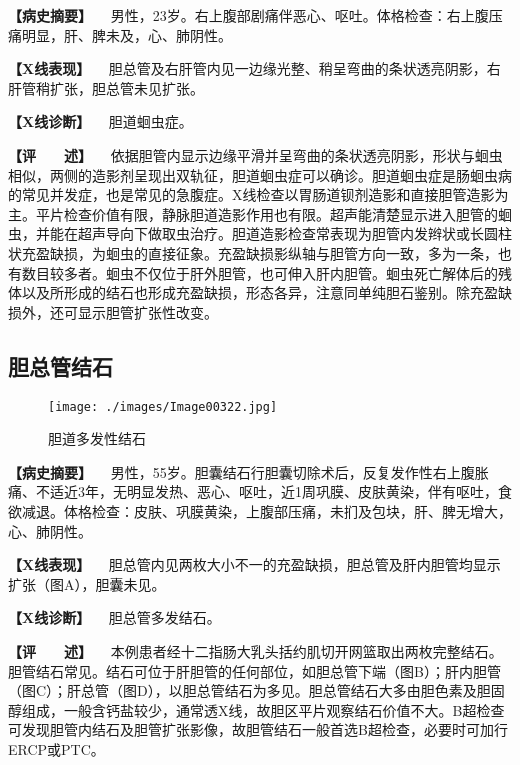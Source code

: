 \textbf{【病史摘要】}
　男性，23岁。右上腹部剧痛伴恶心、呕吐。体格检查：右上腹压痛明显，肝、脾未及，心、肺阴性。

\textbf{【X线表现】}
　胆总管及右肝管内见一边缘光整、稍呈弯曲的条状透亮阴影，右肝管稍扩张，胆总管未见扩张。

\textbf{【X线诊断】} 　胆道蛔虫症。

\textbf{【评　　述】}
　依据胆管内显示边缘平滑并呈弯曲的条状透亮阴影，形状与蛔虫相似，两侧的造影剂呈现出双轨征，胆道蛔虫症可以确诊。胆道蛔虫症是肠蛔虫病的常见并发症，也是常见的急腹症。X线检查以胃肠道钡剂造影和直接胆管造影为主。平片检查价值有限，静脉胆道造影作用也有限。超声能清楚显示进入胆管的蛔虫，并能在超声导向下做取虫治疗。胆道造影检查常表现为胆管内发辫状或长圆柱状充盈缺损，为蛔虫的直接征象。充盈缺损影纵轴与胆管方向一致，多为一条，也有数目较多者。蛔虫不仅位于肝外胆管，也可伸入肝内胆管。蛔虫死亡解体后的残体以及所形成的结石也形成充盈缺损，形态各异，注意同单纯胆石鉴别。除充盈缺损外，还可显示胆管扩张性改变。

\subsection{胆总管结石}

\begin{figure}[!htbp]
 \centering
 \texttt{[image: ./images/Image00322.jpg]}
 \captionsetup{justification=centering}
 \caption{胆道多发性结石}
 \label{fig5-8-4}
  \end{figure} 

\textbf{【病史摘要】}
　男性，55岁。胆囊结石行胆囊切除术后，反复发作性右上腹胀痛、不适近3年，无明显发热、恶心、呕吐，近1周巩膜、皮肤黄染，伴有呕吐，食欲减退。体格检查：皮肤、巩膜黄染，上腹部压痛，未扪及包块，肝、脾无增大，心、肺阴性。

\textbf{【X线表现】}
　胆总管内见两枚大小不一的充盈缺损，胆总管及肝内胆管均显示扩张（图A），胆囊未见。

\textbf{【X线诊断】} 　胆总管多发结石。

\textbf{【评　　述】}
　本例患者经十二指肠大乳头括约肌切开网篮取出两枚完整结石。胆管结石常见。结石可位于肝胆管的任何部位，如胆总管下端（图B）；肝内胆管（图C）；肝总管（图D），以胆总管结石为多见。胆总管结石大多由胆色素及胆固醇组成，一般含钙盐较少，通常透X线，故胆区平片观察结石价值不大。B超检查可发现胆管内结石及胆管扩张影像，故胆管结石一般首选B超检查，必要时可加行ERCP或PTC。

